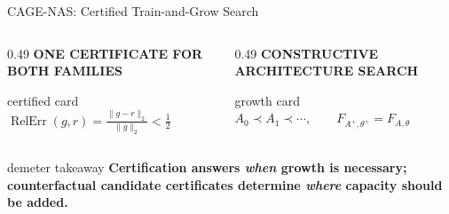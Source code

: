 \begin{frame}[t]{CAGE-NAS: Certified Train-and-Grow Search}
\begin{center}
  \end{center}

  \vspace{-0.06cm}
  \begin{columns}[T,onlytextwidth]
    \begin{column}{0.49\textwidth}
      {\color{EnstaBlue}\bfseries\scriptsize ONE CERTIFICATE FOR BOTH FAMILIES}
      \vspace{0.03cm}

      \begin{beamercolorbox}[rounded=true,sep=0.11cm,wd=\linewidth]{certified card}
        \centering
        \fontsize{7.0}{8.3}\selectfont
        \(\displaystyle
          \operatorname{RelErr}(g,r)
          =\frac{\lVert g-r\rVert_2}{\lVert g\rVert_2}
          <\frac12
        \)
      \end{beamercolorbox}
    \end{column}

    \begin{column}{0.49\textwidth}
      {\color{EnstaBlue}\bfseries\scriptsize CONSTRUCTIVE ARCHITECTURE SEARCH}
      \vspace{0.03cm}

      \begin{beamercolorbox}[rounded=true,sep=0.11cm,wd=\linewidth]{growth card}
        \centering
        \fontsize{6.9}{8.2}\selectfont
        \(\displaystyle
          A_0\prec A_1\prec\cdots,
          \qquad F_{A^+,\theta^+}=F_{A,\theta}
        \)
      \end{beamercolorbox}
    \end{column}
  \end{columns}

  \vspace{0.10cm}
  \begin{beamercolorbox}[rounded=true,sep=0.10cm,wd=\linewidth]{demeter takeaway}
    {\fontsize{7.3}{8.7}\selectfont\bfseries
    Certification answers \emph{when} growth is necessary; counterfactual
    candidate certificates determine \emph{where} capacity should be added.}
  \end{beamercolorbox}
\end{frame}
